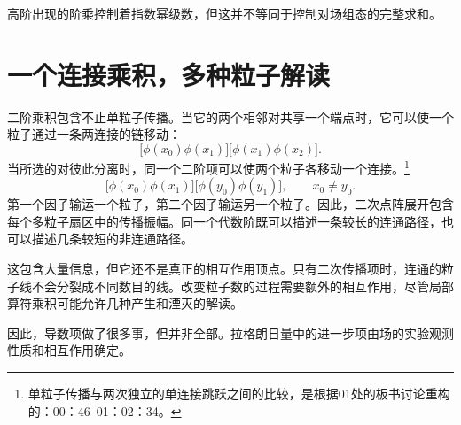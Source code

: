 高阶出现的阶乘控制着指数幂级数，但这并不等同于控制对场组态的完整求和。

\begin{classroomqa}
\end{classroomqa}

\section{一个连接乘积，多种粒子解读}

二阶乘积包含不止单粒子传播。当它的两个相邻对共享一个端点时，它可以使一个粒子通过一条两连接的链移动：
\begin{equation}
\bigl[\phi(x_0)\phi(x_1)\bigr]
\bigl[\phi(x_1)\phi(x_2)\bigr].
\end{equation}
当所选的对彼此分离时，同一个二阶项可以使两个粒子各移动一个连接。\footnote{单粒子传播与两次独立的单连接跳跃之间的比较，是根据01处的板书讨论重构的：00：46--01：02：34。}
\begin{equation}
\bigl[\phi(x_0)\phi(x_1)\bigr]
\bigl[\phi(y_0)\phi(y_1)\bigr],
\qquad x_0\neq y_0.
\end{equation}
第一个因子输运一个粒子，第二个因子输运另一个粒子。因此，二次点阵展开包含每个多粒子扇区中的传播振幅。同一个代数阶既可以描述一条较长的连通路径，也可以描述几条较短的非连通路径。

这包含大量信息，但它还不是真正的相互作用顶点。只有二次传播项时，连通的粒子线不会分裂成不同数目的线。改变粒子数的过程需要额外的相互作用，尽管局部算符乘积可能允许几种产生和湮灭的解读。

\begin{classroomqa}
\end{classroomqa}


因此，导数项做了很多事，但并非全部。拉格朗日量中的进一步项由场的实验观测性质和相互作用确定。

